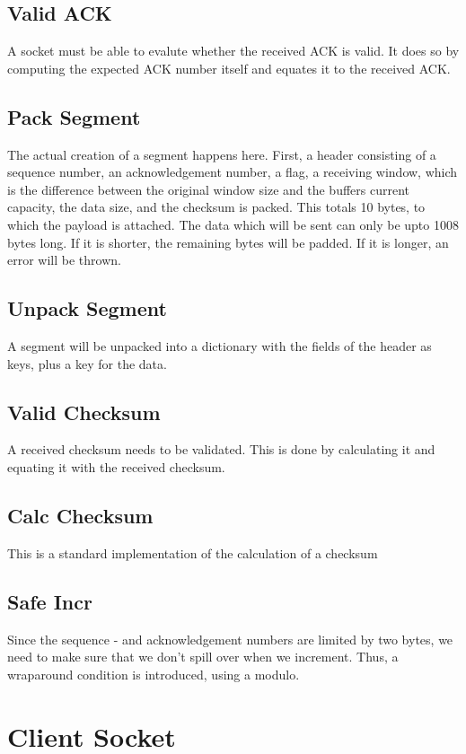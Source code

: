\documentclass{article}
\begin{document}
\subsection{Valid ACK}
A socket must be able to evalute whether the received ACK is valid. It does so by computing the expected ACK number itself and equates it to the received ACK.

\subsection{Pack Segment}
The actual creation of a segment happens here. First, a header consisting of a sequence number, an acknowledgement number, a flag, a receiving window, which is the difference between the original window size and the buffers current capacity, the data size, and the checksum is packed. This totals 10 bytes, to which the payload is attached. The data which will be sent can only be upto 1008 bytes long. If it is shorter, the remaining bytes will be padded. If it is longer, an error will be thrown.

\subsection{Unpack Segment}
A segment will be unpacked into a dictionary with the fields of the header as keys, plus a key for the data.

\subsection{Valid Checksum}
A received checksum needs to be validated. This is done by calculating it and equating it with the received checksum.

\subsection{Calc Checksum}
This is a standard implementation of the calculation of a checksum

\subsection{Safe Incr}
Since the sequence - and acknowledgement numbers are limited by two bytes, we need to make sure that we don't spill over when we increment. Thus, a wraparound condition is introduced, using a modulo.


\section{Client Socket}
\end{document}
